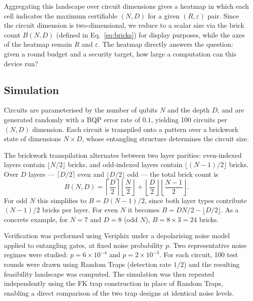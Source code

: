 \documentclass[]{article}
\begin{document}
Aggregating this landscape over circuit dimensions gives a heatmap in which
each cell indicates the maximum certifiable $(N, D)$ for a given
$(R, \varepsilon)$ pair. Since the circuit dimension is two-dimensional, we
reduce to a scalar size via the brick count $B(N, D)$ (defined in
Eq.~\eqref{eq:bricks}) for display purposes, while the axes of the heatmap
remain $R$ and $\varepsilon$. The heatmap directly answers the question: given
a round budget and a security target, how large a computation can this device
run?

\subsection{Simulation}
\label{subsec:simulation}

Circuits are parameterised by the number of qubits $N$ and the depth $D$, and
are generated randomly with a BQP error rate of $0.1$, yielding 100 circuits
per $(N, D)$ dimension. Each circuit is transpiled onto a pattern over a
brickwork state of dimensions $N \times D$, whose entangling structure
determines the circuit size.

The brickwork transpilation alternates between two layer parities: even-indexed
layers contain $\lfloor N/2 \rfloor$ bricks, and odd-indexed layers contain
$\lfloor (N-1)/2 \rfloor$ bricks. Over $D$ layers --- $\lceil D/2 \rceil$ even
and $\lfloor D/2 \rfloor$ odd --- the total brick count is
\begin{equation}
  B(N,D) = \left\lceil \frac{D}{2} \right\rceil \left\lfloor \frac{N}{2} \right\rfloor
          + \left\lfloor \frac{D}{2} \right\rfloor \left\lfloor \frac{N-1}{2} \right\rfloor.
  \label{eq:bricks}
\end{equation}
For odd $N$ this simplifies to $B = D(N-1)/2$, since both layer types
contribute $(N-1)/2$ bricks per layer. For even $N$ it becomes $B = DN/2 -
\lfloor D/2 \rfloor$. As a concrete example, for $N = 7$ and $D = 8$ (odd
$N$), $B = 8 \times 3 = 24$ bricks.

Verification was performed using Veriphix under a depolarising noise model
applied to entangling gates, at fixed noise probability $p$. Two representative
noise regimes were studied: $p = 6 \times 10^{-4}$ and $p = 2 \times 10^{-3}$.
For each circuit, 100 test rounds were drawn using Random Traps (detection rate
$1/2$) and the resulting feasibility landscape was computed. The simulation was
then repeated independently using the FK trap construction in place of Random
Traps, enabling a direct comparison of the two trap designs at identical noise
levels.
\end{document}
